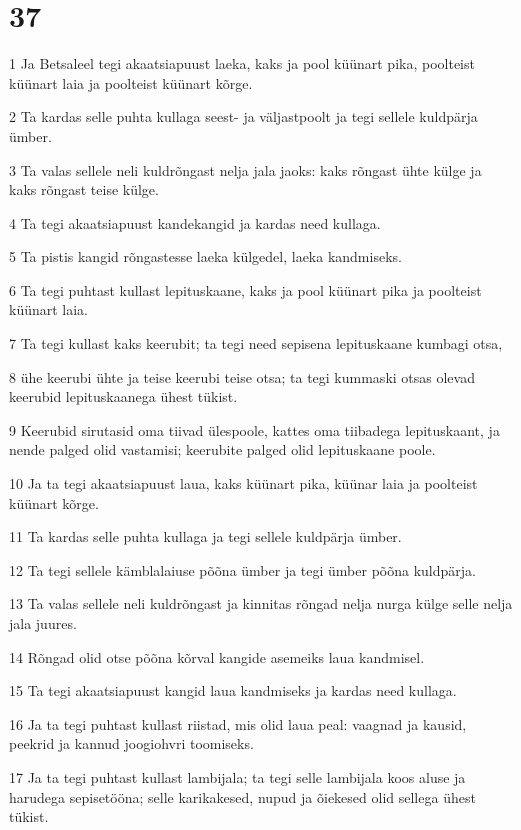 \chapter{37}

\par 1 Ja Betsaleel tegi akaatsiapuust laeka, kaks ja pool küünart pika, poolteist küünart laia ja poolteist küünart kõrge.
\par 2 Ta kardas selle puhta kullaga seest- ja väljastpoolt ja tegi sellele kuldpärja ümber.
\par 3 Ta valas sellele neli kuldrõngast nelja jala jaoks: kaks rõngast ühte külge ja kaks rõngast teise külge.
\par 4 Ta tegi akaatsiapuust kandekangid ja kardas need kullaga.
\par 5 Ta pistis kangid rõngastesse laeka külgedel, laeka kandmiseks.
\par 6 Ta tegi puhtast kullast lepituskaane, kaks ja pool küünart pika ja poolteist küünart laia.
\par 7 Ta tegi kullast kaks keerubit; ta tegi need sepisena lepituskaane kumbagi otsa,
\par 8 ühe keerubi ühte ja teise keerubi teise otsa; ta tegi kummaski otsas olevad keerubid lepituskaanega ühest tükist.
\par 9 Keerubid sirutasid oma tiivad ülespoole, kattes oma tiibadega lepituskaant, ja nende palged olid vastamisi; keerubite palged olid lepituskaane poole.
\par 10 Ja ta tegi akaatsiapuust laua, kaks küünart pika, küünar laia ja poolteist küünart kõrge.
\par 11 Ta kardas selle puhta kullaga ja tegi sellele kuldpärja ümber.
\par 12 Ta tegi sellele kämblalaiuse põõna ümber ja tegi ümber põõna kuldpärja.
\par 13 Ta valas sellele neli kuldrõngast ja kinnitas rõngad nelja nurga külge selle nelja jala juures.
\par 14 Rõngad olid otse põõna kõrval kangide asemeiks laua kandmisel.
\par 15 Ta tegi akaatsiapuust kangid laua kandmiseks ja kardas need kullaga.
\par 16 Ja ta tegi puhtast kullast riistad, mis olid laua peal: vaagnad ja kausid, peekrid ja kannud joogiohvri toomiseks.
\par 17 Ja ta tegi puhtast kullast lambijala; ta tegi selle lambijala koos aluse ja harudega sepisetööna; selle karikakesed, nupud ja õiekesed olid sellega ühest tükist.
